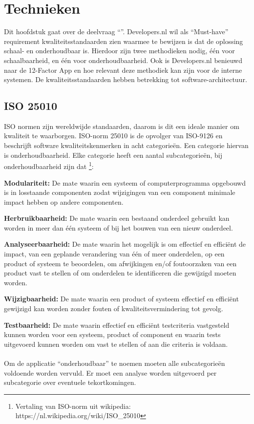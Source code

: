 \chapter{Technieken}

\label{Chapter3}

Dit hoofdstuk gaat over de deelvraag \enquote{\deeltechnieken}. Developers.nl wil als \enquote{Must-have} requirement kwaliteitsstandaarden zien waarmee te bewijzen is dat de oplossing schaal- en onderhoudbaar is. Hierdoor zijn twee methodieken nodig, één voor schaalbaarheid, en één voor onderhoudbaarheid. Ook is Developers.nl benieuwd naar de 12-Factor App en hoe relevant deze methodiek kan zijn voor de interne systemen. De kwaliteitsstandaarden hebben betrekking tot software-architectuur.

\section{ISO 25010}

ISO normen zijn wereldwijde standaarden, daarom is dit een ideale manier om kwaliteit te waarborgen. ISO-norm 25010 \parencite{ISO25010} is de opvolger van ISO-9126 en beschrijft software kwaliteitskenmerken in acht categorieën. Een categorie hiervan is onderhoudbaarheid. Elke categorie heeft een aantal subcategorieën, bij onderhoudbaarheid zijn dat \footnote{Vertaling van ISO-norm uit wikipedia: https://nl.wikipedia.org/wiki/ISO\_25010}:

\textbf{Modulariteit:} De mate waarin een systeem of computerprogramma opgebouwd is in losstaande componenten zodat wijzigingen van een component minimale impact hebben op andere componenten.

\textbf{Herbruikbaarheid:} De mate waarin een bestaand onderdeel gebruikt kan worden in meer dan één systeem of bij het bouwen van een nieuw onderdeel.

\textbf{Analyseerbaarheid:} De mate waarin het mogelijk is om effectief en efficiënt de impact, van een geplande verandering van één of meer onderdelen, op een product of systeem te beoordelen, om afwijkingen en/of foutoorzaken van een product vast te stellen of om onderdelen te identificeren die gewijzigd moeten worden.

\textbf{Wijzigbaarheid:} De mate waarin een product of systeem effectief en efficiënt gewijzigd kan worden zonder fouten of kwaliteitsvermindering tot gevolg.

\textbf{Testbaarheid:} De mate waarin effectief en efficiënt testcriteria vastgesteld kunnen worden voor een systeem, product of component en waarin tests uitgevoerd kunnen worden om vast te stellen of aan die criteria is voldaan.\\\\
Om de applicatie \enquote{onderhoudbaar} te noemen moeten alle subcategorieën voldoende worden vervuld. Er moet een analyse worden uitgevoerd per subcategorie over eventuele tekortkomingen.


